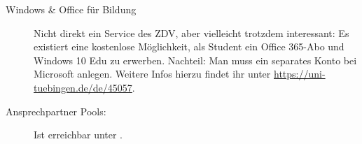 \begin{description}
   \item[Windows \& Office für Bildung] Nicht direkt ein Service des ZDV, aber vielleicht trotzdem interessant: Es existiert eine kostenlose Möglichkeit, als Student ein Office 365-Abo und Windows 10 Edu zu erwerben. Nachteil: Man muss ein separates Konto bei Microsoft anlegen. Weitere Infos hierzu findet ihr unter \url{https://uni-tuebingen.de/de/45057}.	%

  \item[Ansprechpartner Pools:]
    Ist erreichbar unter .

	
\end{description}
